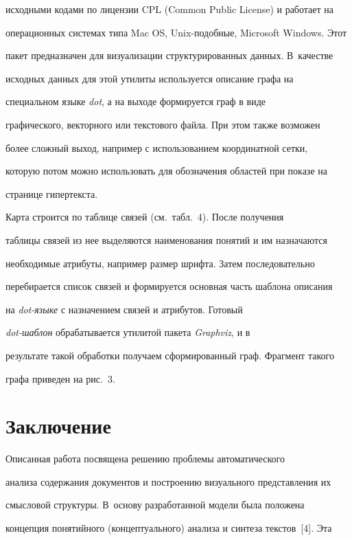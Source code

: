 исходными кодами по лицензии CPL (Common Public License) и работает на 

операционных системах типа Mac OS, Unix-подобные, Microsoft Windows. Этот 

пакет предназначен для визуализации структурированных данных. В~качестве 

исходных данных для этой утилиты используется описание графа на 

специальном языке \textit{dot}, а на выходе формируется граф в виде 

графического, векторного или текстового файла. При этом также возможен 

более сложный выход, например с использованием координатной сетки, 

которую потом можно использовать для обозначения областей при показе на 

странице гипертекста.

     

     Карта строится по таблице связей (см.\ табл.~4). После получения 

таблицы связей из нее выделяются наименования понятий и им назначаются 

необходимые атрибуты, например размер шрифта. Затем последовательно 

перебирается список связей и формируется основная часть шаблона описания 

на \textit{dot-язы\-ке} с назначением связей и атрибутов. Готовый 

     \textit{dot-шаб\-лон} обрабатывается утилитой пакета \textit{Graphviz}, и в 

результате такой обработки получаем сформированный граф. Фрагмент такого 

графа приведен на рис.~3.

     



    \section{Заключение}

     

     Описанная работа посвящена решению проблемы автоматического 

анализа содержания документов и построению визуального представления их 

смысловой структуры. В~основу разработанной модели была положена 

концепция понятийного (концептуального) анализа и синтеза текстов~[4]. Эта 

